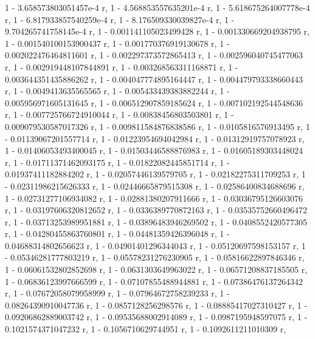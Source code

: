 \documentclass[a4paper,10pt]{article}
\begin{document}
\begin{eulernotebook}
\begin{eulercomment}
\begin{eulercomment}
\begin{eulercomment}
\begin{eulercomment}
\begin{eulercomment}
\begin{eulercomment}
\begin{eulercomment}
\begin{eulercomment}
\begin{eulercomment}
\begin{eulercomment}
\begin{eulercomment}
\begin{eulercomment}
\begin{eulercomment}
\begin{eulercomment}
\begin{eulercomment}
\begin{eulercomment}
\begin{eulercomment}
\begin{eulercomment}
\begin{eulercomment}
\begin{eulercomment}
\begin{eulercomment}
\begin{eulercomment}
\begin{eulercomment}
\begin{eulercomment}
\begin{eulercomment}
\begin{eulercomment}
\begin{eulercomment}
\begin{eulercomment}
\begin{euleroutput}
  1 - 3.658573803051457e-4 r, 1 - 4.568853557635201e-4 r, 
  1 - 5.618675264007778e-4 r, 1 - 6.817933857540259e-4 r, 
  1 - 8.176509330039827e-4 r, 1 - 9.704265741758145e-4 r, 
  1 - 0.001141105023499428 r, 1 - 0.001330669204938795 r, 
  1 - 0.001540100153900437 r, 1 - 0.001770376919130678 r, 
  1 - 0.002022476464811601 r, 1 - 0.002297373572865413 r, 
  1 - 0.002596040745477063 r, 1 - 0.002919448107844891 r, 
  1 - 0.003268563311168871 r, 1 - 0.003644351435886262 r, 
  1 - 0.004047774895164447 r, 1 - 0.004479793338660443 r, 
  1 - 0.0049413635565565 r, 1 - 0.005433439383882244 r, 
  1 - 0.005956971605131645 r, 1 - 0.006512907859185624 r, 
  1 - 0.007102192544548636 r, 1 - 0.007725766724910044 r, 
  1 - 0.00838456803503801 r, 1 - 0.009079530587017326 r, 
  1 - 0.009811584876838586 r, 1 - 0.0105816576913495 r, 
  1 - 0.01139067201557714 r, 1 - 0.01223954694042984 r, 
  1 - 0.01312919757078923 r, 1 - 0.01406053493400045 r, 
  1 - 0.01503446588876983 r, 1 - 0.01605189303448024 r, 
  1 - 0.01711371462093175 r, 1 - 0.01822082445851714 r, 
  1 - 0.01937411182884202 r, 1 - 0.02057446139579705 r, 
  1 - 0.02182275311709253 r, 1 - 0.02311986215626333 r, 
  1 - 0.02446665879515308 r, 1 - 0.02586400834688696 r, 
  1 - 0.02731277106934082 r, 1 - 0.02881380207911666 r, 
  1 - 0.03036795126603076 r, 1 - 0.03197606320812652 r, 
  1 - 0.0336389770872163 r, 1 - 0.03535752660496472 r, 
  1 - 0.03713253989951881 r, 1 - 0.03896483946269502 r, 
  1 - 0.0408552420577305 r, 1 - 0.04280455863760801 r, 
  1 - 0.04481359426396048 r, 1 - 0.04688314802656623 r, 
  1 - 0.04901401296344043 r, 1 - 0.05120697598153157 r, 
  1 - 0.05346281777803219 r, 1 - 0.05578231276230905 r, 
  1 - 0.05816622897846346 r, 1 - 0.06061532802852698 r, 
  1 - 0.0631303649963022 r, 1 - 0.06571208837185505 r, 
  1 - 0.06836123997666599 r, 1 - 0.07107855488944881 r, 
  1 - 0.07386476137264342 r, 1 - 0.07672058079958999 r, 
  1 - 0.07964672758239233 r, 1 - 0.08264390910047736 r, 
  1 - 0.0857128256298576 r, 1 - 0.08885417027310427 r, 
  1 - 0.09206862889003742 r, 1 - 0.09535688002914089 r, 
  1 - 0.0987195948597075 r, 1 - 0.1021574371047232 r, 
  1 - 0.1056710629744951 r, 1 - 0.1092611211010309 r, 

\end{euleroutput}
\end{eulercomment}
\end{eulercomment}
\end{eulercomment}
\end{eulercomment}
\end{eulercomment}
\end{eulercomment}
\end{eulercomment}
\end{eulercomment}
\end{eulercomment}
\end{eulercomment}
\end{eulercomment}
\end{eulercomment}
\end{eulercomment}
\end{eulercomment}
\end{eulercomment}
\end{eulercomment}
\end{eulercomment}
\end{eulercomment}
\end{eulercomment}
\end{eulercomment}
\end{eulercomment}
\end{eulercomment}
\end{eulercomment}
\end{eulercomment}
\end{eulercomment}
\end{eulercomment}
\end{eulercomment}
\end{eulercomment}
\end{eulernotebook}
\end{document}
